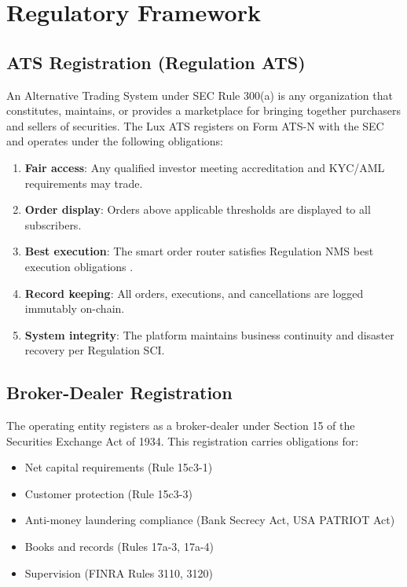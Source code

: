 \section{Regulatory Framework}
\label{sec:regulatory}

\subsection{ATS Registration (Regulation ATS)}

An Alternative Trading System under SEC Rule 300(a) is any organization that constitutes, maintains, or provides a marketplace for bringing together purchasers and sellers of securities. The Lux ATS registers on Form ATS-N with the SEC and operates under the following obligations:

\begin{enumerate}[nosep]
  \item \textbf{Fair access}: Any qualified investor meeting accreditation and KYC/AML requirements may trade.
  \item \textbf{Order display}: Orders above applicable thresholds are displayed to all subscribers.
  \item \textbf{Best execution}: The smart order router satisfies Regulation NMS best execution obligations \cite{lux-smart-order-routing}.
  \item \textbf{Record keeping}: All orders, executions, and cancellations are logged immutably on-chain.
  \item \textbf{System integrity}: The platform maintains business continuity and disaster recovery per Regulation SCI.
\end{enumerate}

\subsection{Broker-Dealer Registration}

The operating entity registers as a broker-dealer under Section 15 of the Securities Exchange Act of 1934. This registration carries obligations for:

\begin{itemize}[nosep]
  \item Net capital requirements (Rule 15c3-1)
  \item Customer protection (Rule 15c3-3)
  \item Anti-money laundering compliance (Bank Secrecy Act, USA PATRIOT Act)
  \item Books and records (Rules 17a-3, 17a-4)
  \item Supervision (FINRA Rules 3110, 3120)
\end{itemize}

